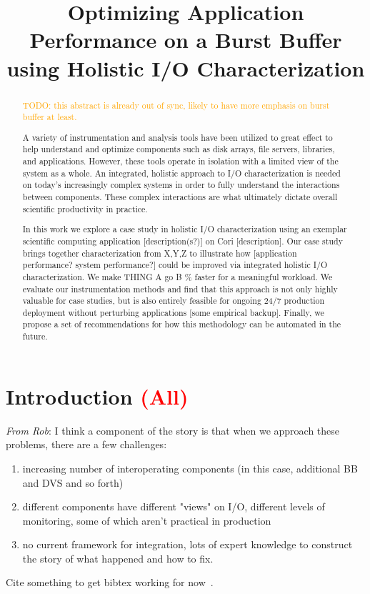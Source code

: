 \documentclass[conference,10pt,compsocconf]{IEEEtran}
\newcommand{\assign}[1]{\textcolor{red}{(#1)}}
\newcommand{\todo}[1]{\textcolor{Orange}{TODO: #1}}
\begin{document}
\title{Optimizing Application Performance on a Burst Buffer using
Holistic I/O Characterization}

\maketitle

\begin{abstract}

\todo{this abstract is already out of sync, likely to have
more emphasis on burst buffer at least.}

A variety of instrumentation and analysis tools have been utilized to
great effect to help understand and optimize components such as disk
arrays, file servers, libraries, and applications.  However, these
tools operate in isolation with a limited view of the system as a whole.
An integrated, holistic approach to I/O characterization is needed on
today's increasingly complex systems in order to fully understand
the interactions between components.  These complex interactions are what 
ultimately dictate overall scientific productivity in practice.

In this work we explore a case study in holistic I/O characterization
using an exemplar scientific computing application [description(s?)] on
Cori [description].  Our case study brings together characterization from
X,Y,Z to illustrate how [application performance?  system performance?]
could be improved via integrated holistic I/O characterization.
We make THING A go B \% faster for a meaningful workload.  We evaluate
our instrumentation methods and find that this approach is not only
highly valuable for case studies, but is also entirely feasible for
ongoing 24/7 production deployment without perturbing applications [some
empirical backup].  Finally, we propose a set of recommendations for
how this methodology can be automated in the future.

\end{abstract}

\section{Introduction \assign{All}}

\emph{From Rob}: I think a component of the story is that when we approach these problems, there are a few challenges:
\begin{enumerate}
\item increasing number of interoperating components (in this case, additional
BB and DVS and so forth)
\item different components have different "views" on I/O, different levels of
monitoring, some of which aren't practical in production
\item no current framework for integration, lots of expert knowledge to
construct the story of what happened and how to fix.
\end{enumerate}
Cite something to get bibtex working for now~\cite{carns200924}.
\end{document}
